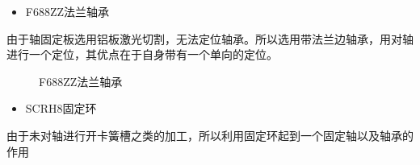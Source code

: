 \documentclass[12pt]{article}
\begin{document}
\begin{CJK}{UTF8}{song}
\begin{itemize}
\item F688ZZ法兰轴承
\end{itemize}
由于轴固定板选用铝板激光切割，无法定位轴承。所以选用带法兰边轴承，用对轴进行一个定位，其优点在于自身带有一个单向的定位。
\begin{figure}[H]
{}
\quad
{}
\caption{F688ZZ法兰轴承}
\end{figure}
\begin{itemize}
\item SCRH8固定环
\end{itemize}
由于未对轴进行开卡簧槽之类的加工，所以利用固定环起到一个固定轴以及轴承的作用
\begin{figure}[H]
{}
\end{figure}
\end{CJK}
\end{document}
